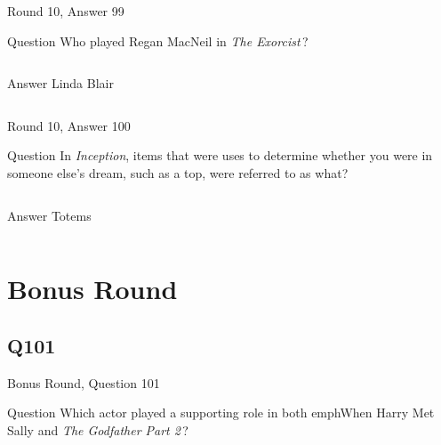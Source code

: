 \documentclass[11pt]{beamer}
\begin{document}
\begin{frame}[t]{Round 10, Answer 99}
\vspace{2em}
\begin{block}{Question}
Who played Regan MacNeil in \emph{The Exorcist}\,?
\end{block}
\pause{}
\begin{columns}[T,totalwidth=\linewidth]
\begin{column}{0.35\linewidth}
\begin{block}{Answer}
Linda Blair
\end{block}
\end{column}
\begin{column}{0.6\linewidth}
\begin{center}
\texttt{[image: \{Images/exorcist]}.jpeg}
\end{center}
\end{column}
\end{columns}
\end{frame}
    

\begin{frame}[t]{Round 10, Answer 100}
\vspace{2em}
\begin{block}{Question}
In \emph{Inception}, items that were uses to determine whether you were in someone else's dream, such as a top, were referred to as what?
\end{block}
\pause{}
\begin{columns}[T,totalwidth=\linewidth]
\begin{column}{0.35\linewidth}
\begin{block}{Answer}
Totems
\end{block}
\end{column}
\begin{column}{0.6\linewidth}
\begin{center}
\texttt{[image: \{Images/totem]}.jpg}
\end{center}
\end{column}
\end{columns}
\end{frame}
    

\section{Bonus Round}
    

\subsection*{Q101}
\begin{frame}[t]{Bonus Round, Question 101}
\vspace{2em}
\begin{block}{Question}
Which actor played a supporting role in both emph{When Harry Met Sally} and \emph{The Godfather Part 2}\,?
\end{block}
\end{frame}
    
\end{document}

